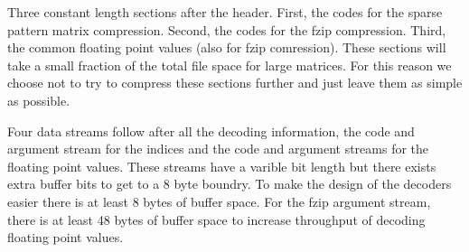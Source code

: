 Three constant length sections after the header. First, the codes for the sparse pattern matrix compression. Second, the codes for the fzip compression. Third, the common floating point values (also for fzip comression). These sections will take a small fraction of the total file space for large matrices. For this reason we choose not to try to compress these sections further and just leave them as simple as possible.

Four data streams follow after all the decoding information, the code and argument stream for the indices and the code and argument streams for the floating point values. These streams have a varible bit length but there exists extra buffer bits to get to a 8 byte boundry. To make the design of the decoders easier there is at least 8 bytes of buffer space. For the fzip argument stream, there is at least 48 bytes of buffer space to increase throughput of decoding floating point values.


